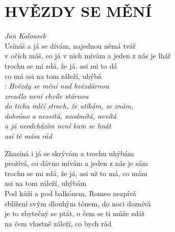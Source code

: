 \section*{\Huge HVĚZDY SE MĚNÍ}
\emph{Jan Kalousek}\\

Usínáš a já se dívám, najednou němá tvář\\
v očích máš, co já v nich mívám a jeden z nás je lhář\\
trochu se mi zdá, že já, asi mi to dá\\
co má asi na tom záleží, uhýbá\\

\textregistered:
\emph{
Hvězdy se mění nad hvězdárnou\\
zrcadlo není chvíle stárnou\\
do ticha mlčí strach, že utíkám, se znám,\\
dohráno a nesvítá, neodmítá, nevítá\\
a já neodcházím není kam se hnát\\
asi tě mám rád\\
}

Zhasíná i já se skrývám a trochu uhýbám\\
prožívá, co dávno mívám a jeden z nás je sám\\
trochu se mi zdá, že já, asi už to má, co mám\\
asi na tom záleží, uhýbám \hspace{1cm} \textregistered\\

Pod kůží a pod balkónem, Romeo nezpívá\\
sblížení svým dlouhým tónem, do noci doznívá\\
je to zbytečný se ptát, o čem se ti může zdát\\
na čem vlastně záleží, co bych rád\hspace{1cm} \textregistered

\newpage
